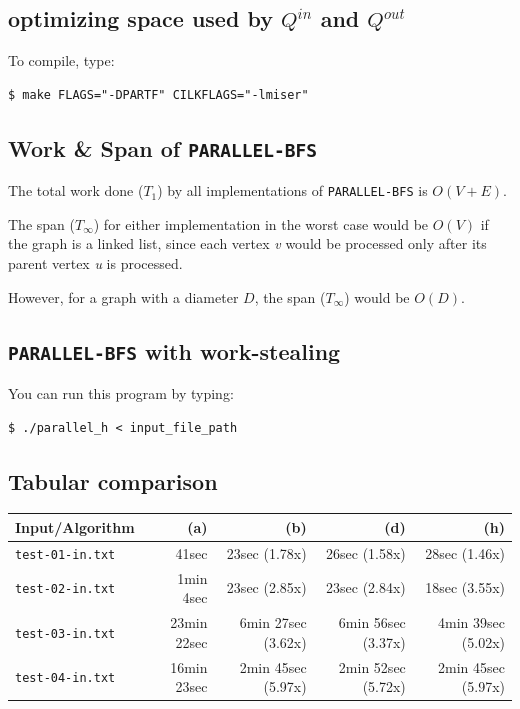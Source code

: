 \documentclass{article}
\begin{document}
\subsection{optimizing space used by $Q^{in}$ and $Q^{out}$}

To compile, type:
\begin{verbatim}
$ make FLAGS="-DPARTF" CILKFLAGS="-lmiser"
\end{verbatim}

\subsection{Work \& Span of \texttt{PARALLEL-BFS}}

The total work done ($T_1$) by all implementations of
\texttt{PARALLEL-BFS} is $O(V + E)$.

The span ($T_\infty$) for either implementation in the worst case
would be $O(V)$ if the graph is a linked list, since each vertex
\textit{v} would be processed only after its parent vertex \textit{u}
is processed.

However, for a graph with a diameter $D$, the span ($T_\infty$) would
be $O(D)$.

\subsection{\texttt{PARALLEL-BFS} with work-stealing}

You can run this program by typing:
\begin{verbatim}
$ ./parallel_h < input_file_path
\end{verbatim}

\subsection{Tabular comparison}

\begin{center}
  \begin{tabular}{| l | r | r | r | r |}
    \hline
    Input/Algorithm & (a) & (b) & (d) & (h) \\ \hline
    \texttt{test-01-in.txt} & 41sec & 23sec (1.78x) & 26sec (1.58x) & 28sec (1.46x) \\ \hline
    \texttt{test-02-in.txt} & 1min 4sec & 23sec (2.85x) & 23sec (2.84x) & 18sec (3.55x) \\ \hline
    \texttt{test-03-in.txt} & 23min 22sec & 6min 27sec (3.62x) & 6min 56sec (3.37x) & 4min 39sec (5.02x) \\ \hline
    \texttt{test-04-in.txt} & 16min 23sec & 2min 45sec (5.97x) & 2min 52sec (5.72x) & 2min 45sec (5.97x) \\
    \hline
  \end{tabular}
\end{center}
\end{document}
